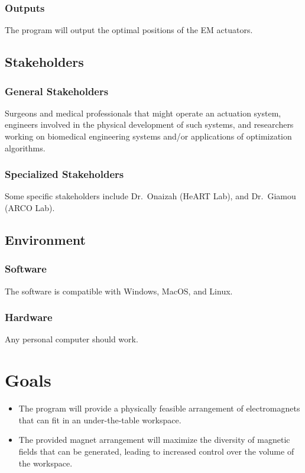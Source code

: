 \documentclass{article}
\begin{document}
\subsubsection{Outputs}
The program will output the optimal positions of the EM actuators. 

\subsection{Stakeholders}
\subsubsection{General Stakeholders}
Surgeons and medical professionals that might operate an actuation system, engineers involved in the physical development of such systems, and researchers working on biomedical engineering systems and/or applications of optimization algorithms.

\subsubsection{Specialized Stakeholders}
Some specific stakeholders include Dr.~Onaizah (HeART Lab), and Dr.~Giamou (ARCO Lab).  

\subsection{Environment}
\subsubsection{Software}
The software is compatible with Windows, MacOS, and Linux.

\subsubsection{Hardware}
Any personal computer should work. 

\section{Goals}
\begin{itemize}
    \item The program will provide a physically feasible arrangement of electromagnets that can fit in an under-the-table workspace.
    \item The provided magnet arrangement will maximize the diversity of magnetic fields that can be generated, leading to increased control over the volume of the workspace. 
\end{itemize}
\end{document}
